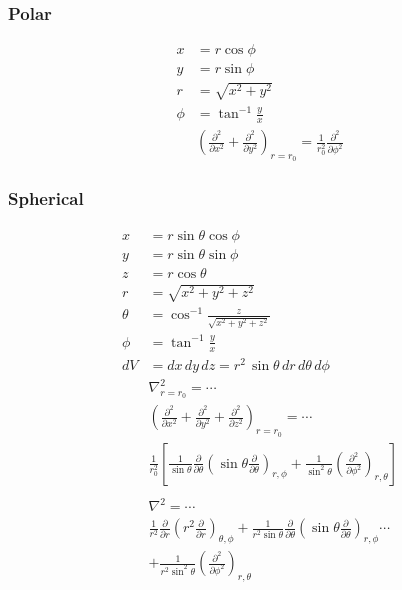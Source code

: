 \subsubsection{Polar}
\begin{align*}
x&=r\cos\phi\\
y&=r\sin\phi\\
r&=\sqrt{x^2+y^2}\\
\phi&=\tan^{-1}{\frac{y}{x}}\\
&\left(\frac{\partial ^2}{\partial x^2} + \frac{\partial ^2}{\partial y^2}\right)_{r=r_0} = \frac{1}{r_0^2}\frac{\partial^2}{\partial \phi^2}
\end{align*}

\subsubsection{Spherical}
\begin{align*}
x&=r\sin\theta\cos\phi\\
y&=r\sin\theta\sin\phi\\
z&=r\cos\theta\\
r&=\sqrt{x^2+y^2+z^2}\\
\theta&=\cos^{-1}\frac{z}{\sqrt{x^2+y^2+z^2}}\\
\phi&=\tan^{-1}{\frac{y}{x}}\\
dV&=dx\,dy\,dz=r^2\,\sin\theta\, dr\, d\theta\, d\phi\\
&\nabla^2_{r=r_0} = \cdots\\
&\left(\frac{\partial ^2}{\partial x^2} + \frac{\partial ^2}{\partial y^2} + \frac{\partial ^2}{\partial z^2}\right)_{r=r_0} =\cdots\\
& \frac{1}{r_0^2}\left[\frac{1}{\sin\theta}\frac{\partial}{\partial \theta}\left(\sin \theta \frac{\partial}{\partial \theta} \right)_{r,\phi} + \frac{1}{\sin^2\theta}\left(\frac{\partial^2}{\partial \phi^2} \right)_{r,\theta}\right]\\
\\
&\nabla^2=\cdots\\
&\frac{1}{r^2}\frac{\partial}{\partial r} \left( r^2 \frac{\partial}{\partial r} \right)_{\theta,\phi} + \frac{1}{r^2 \sin \theta}\frac{\partial}{\partial \theta}\left(\sin \theta \frac{\partial}{\partial \theta} \right)_{r,\phi} \cdots \\
&+ \frac{1}{r^2 \sin^2 \theta}\left(\frac{\partial^2}{\partial \phi ^2}\right)_{r,\theta}
\end{align*}
